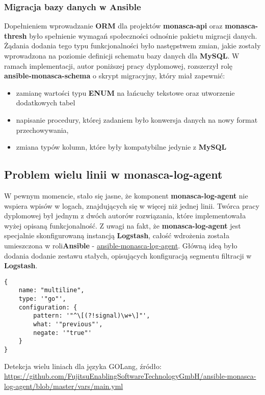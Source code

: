     \subsubsection{Migracja bazy danych w Ansible}
    Dopełnieniem wprowadzanie \textbf{ORM} dla projektów \textbf{monasca-api} oraz \textbf{monasca-thresh} było spełnienie
    wymagań społeczności odnośnie pakietu migracji danych. Żądania dodania tego typu funkcjonalności było następstwem zmian, jakie
    zostały wprowadzona na poziomie definicji schematu bazy danych dla \textbf{MySQL}. W ramach implementacji, autor poniższej pracy dyplomowej,
    rozszerzył rolę \textbf{ansible-monasca-schema} o skrypt migracyjny, który miał zapewnić:
    \begin{itemize}
        \item zamianę wartości typu \textbf{ENUM} na łańcuchy tekstowe oraz utworzenie dodatkowych tabel
        \item napisanie procedury, której zadaniem było konwersja danych na nowy format przechowywania,
        \item zmiana typów kolumn, które były kompatybilne jedynie z \textbf{MySQL}
    \end{itemize}

\subsection{Problem wielu linii w monasca-log-agent}
\label{chapter:application:own_work:monasca_log_agent}

W pewnym momencie, stało się jasne, że komponent \textbf{monasca-log-agent} nie wspiera wpisów w logach, znajdujących się w więcej
niż jednej linii. Twórca pracy dyplomowej był jednym z dwóch autorów rozwiązania, które implementowała wyżej opisaną funkcjonalność.
Z uwagi na fakt, że \textbf{monasca-log-agent} jest specjalnie skonfigurowaną instancją \textbf{Logstash}, całość wdrożenia została
umieszczona w roli\textbf{Ansible} - \href{https://github.com/FujitsuEnablingSoftwareTechnologyGmbH/ansible-monasca-log-agent}{ansible-monasca-log-agent}.
Główną ideą było dodania dodanie zestawu stałych, opisujących konfiguracją segmentu filtracji w \textbf{Logstash}.

\begin{listing}[H]
    \begin{verbatim}
{
    name: "multiline",
    type: '"go"',
    configuration: {
        pattern: '"^\[(?!signal)\w+\]"',
        what: '"previous"',
        negate: '"true"'
    }
}
    \end{verbatim}
    \label{chapter:application:own_work:monasca_log_agent:filter_example}
    \caption[Detekcja wielu liniach dla języka GOLang]{
        Detekcja wielu liniach dla języka GOLang, źródło: \url{https://github.com/FujitsuEnablingSoftwareTechnologyGmbH/ansible-monasca-log-agent/blob/master/vars/main.yml}}
\end{listing}

